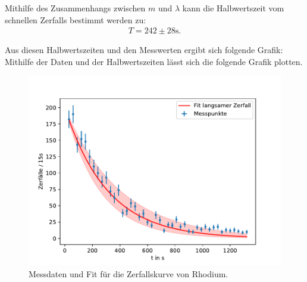 Mithilfe des Zusammenhangs zwischen $m$ und $\lambda $ kann die Halbwertszeit vom schnellen Zerfalls bestimmt werden zu:
\begin{align*}
    T = 242 \pm  28 \si{\second}.
\end{align*}

Aus diesen Halbwertszeiten und den Messwerten ergibt sich folgende Grafik:
Mithilfe der Daten und der Halbwertszeiten lässt sich die folgende Grafik plotten.
\begin{figure}[H]
	\centering
	\includegraphics{Daten/Rhodium.pdf}
	\caption{Messdaten und Fit für die Zerfallskurve von Rhodium.}
	\label{fig:zerfallskurve2}
\end{figure}